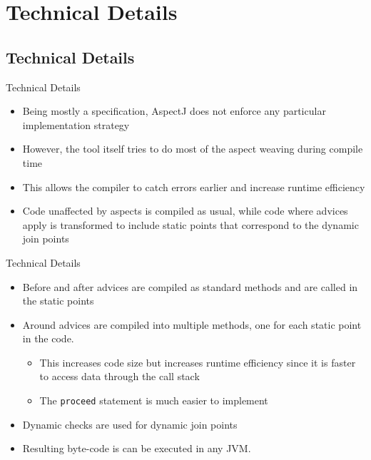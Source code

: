 \documentclass[11pt]{beamer}
\begin{document}

\section{Technical Details}
\subsection*{Technical Details}

\begin{frame}{Technical Details}
\begin{itemize}
   \item Being mostly a specification, AspectJ does not enforce any particular implementation strategy
   \item However, the tool itself tries to do most of the aspect weaving during compile time
   \item This allows the compiler to catch errors earlier and increase runtime efficiency
   \item Code unaffected by aspects is compiled as usual, while code where advices apply is transformed
   to include static points that correspond to the dynamic join points
\end{itemize}
\end{frame}

\begin{frame}{Technical Details}
\begin{itemize}
   \item Before and after advices are compiled as standard methods and are called in the static points
   \item Around advices are compiled into multiple methods, one for each static point in the code.
   \begin{itemize}
      \item This increases code size but increases runtime efficiency since it is faster to access data through the call stack
      \item The \texttt{proceed} statement is much easier to implement
   \end{itemize}
   \item Dynamic checks are used for dynamic join points
   \item Resulting byte-code is can be executed in any JVM.
\end{itemize}
\end{frame}
\end{document}

